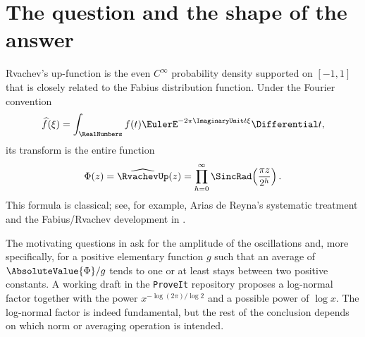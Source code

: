\documentclass[11pt,oneside]{article}
\theoremstyle{definition}
\theoremstyle{remark}
\newcommand{\Phiup}{\Phi}
\begin{document}
\begin{abstract}
We also prove: (i) every interval between consecutive integer zeros contains exactly one
extremum, whose sign is the signed Thue--Morse value; (ii) the normalized arithmetic means
have a nonconstant dyadic phase profile, so a plain Cesaro limit does not exist although the
weaker two-sided boundedness criterion does hold; and (iii) for each fixed $r\ge0$, the
extremum immediately to the right of $2^{n-1}+r$ satisfies an explicit asymptotic of order
$\exp(- (\log x)^2/\log2+\BigO(\log x))$, twice the generic log-square rate in the leading
quadratic term.  These results identify precisely what is correct in the existing decay-rate
draft: its power $x^{-\log(2\pi)/\log2}$ is the RMS power, not a pointwise or optimal-envelope
power, and no additional universal power of $\log x$ repairs that mismatch.
\end{abstract}

\tableofcontents
\newpage

\section{The question and the shape of the answer}
\label{sec:introduction}

Rvachev's up-function is the even $C^\infty$ probability density supported on $[-1,1]$
that is closely related to the Fabius distribution function.  Under the Fourier convention
\[
 \widehat f(\xi)=\int_{\RealNumbers}f(t)\EulerE^{-2\pi\ImaginaryUnit t\xi}\Differential t,
\]
its transform is the entire function
\begin{equation}
 \Phiup(z)=\widehat{\RvachevUp}(z)
 =\prod_{h=0}^{\infty}\SincRad\!\left(\frac{\pi z}{2^h}\right).
 \label{eq:Phi-definition}
\end{equation}
This formula is classical; see, for example, Arias de Reyna's systematic treatment
\cite{arias1982} and the Fabius/Rvachev development in \cite{proveit}.

The motivating questions in \cite{mse-extrema,mse-decay} ask for the amplitude of the
oscillations and, more specifically, for a positive elementary function $g$ such that an
average of $\AbsoluteValue{\Phiup}/g$ tends to one or at least stays between two positive constants.
A working draft in the \texttt{ProveIt} repository \cite{decay-draft} proposes a log-normal
factor together with the power $x^{-\log(2\pi)/\log2}$ and a possible power of $\log x$.
The log-normal factor is indeed fundamental, but the rest of the conclusion depends on
which norm or averaging operation is intended.
\end{document}
